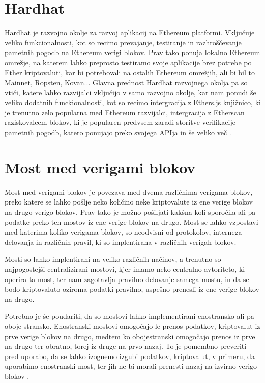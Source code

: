 \documentclass[a4paper,12pt,openright]{book}
\begin{document}
\section{Hardhat}
Hardhat je razvojno okolje za razvoj aplikacij na Ethereum platformi.
Vključuje veliko funkcionalnosti, kot so recimo prevajanje, testiranje in razhroščevanje pametnih pogodb na Ethereum verigi blokov.
Prav tako ponuja lokalno Ethereum omrežje, na katerem lahko preprosto testiramo svoje aplikacije brez potrebe po Ether kriptovaluti, kar bi potrebovali na ostalih Ethereum omrežjih, ali bi bil to Mainnet, Ropsten, Kovan...
Glavna prednost Hardhat razvojnega okolja pa so vtiči, katere lahko razvijalci vključijo v samo razvojno okolje, kar nam ponudi še veliko dodatnih funckionalnosti, kot so recimo intergracija z Ethers.js knjižnico, ki je trenutno zelo popularna med Ethereum razvijalci, intergracija z Etherscan raziskovalcem blokov, ki je popularen predvsem zaradi storitve verifikacije pametnih pogodb, katero ponujajo preko svojega APIja in še veliko več \cite{hardhat_docs}.

\section{Most med verigami blokov}
Most med verigami blokov je povezava med dvema različnima verigama blokov, preko katere se lahko pošlje neko količino neke kriptovalute iz ene verige blokov na drugo verigo blokov.
Prav tako je možno pošiljati kakšna koli sporočila ali pa podatke preko teh mostov iz ene verige blokov na drugo.
Most se lahko vzpostavi med katerima koliko verigama blokov, so neodvisni od protokolov, internega delovanja in različnih pravil, ki so implentirana v različnih verigah blokov.

Mosti so lahko implentirani na veliko različnih načinov, a trenutno so najpogostejši centralizirani mostovi, kjer imamo neko centralno avtoriteto, ki operira ta most, ter nam zagotavlja pravilno delovanje samega mostu, in da se bodo kriptovaluto oziroma podatki pravilno, uspešno prenesli iz ene verige blokov na drugo.

Potrebno je še poudariti, da so mostovi lahko implementirani enostransko ali pa oboje stransko.
Enostranski mostovi omogočajo le prenos podatkov, kriptovalut iz prve verige blokov na drugo, medtem ko obojestranski omogočajo prenos iz prve na drugo ter obratno, torej iz druge na prvo nazaj.
To je pomembno preveriti pred uporabo, da se lahko izognemo izgubi podatkov, kriptovalut, v primeru, da uporabimo enostranski most, ter jih ne bi morali prenesti nazaj na izvirno verigo blokov \cite{blockchain_bridges_coinmarketcap}.
\end{document}
